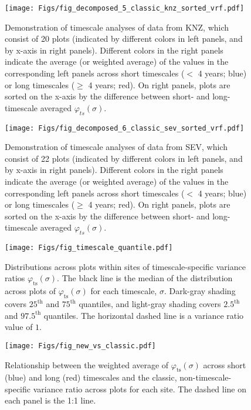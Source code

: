 \documentclass[letterpaper,11pt]{article}
\begin{document}
\begin{figure}
\texttt{[image: Figs/fig\_decomposed\_5\_classic\_knz\_sorted\_vrf.pdf]}
\caption{Demonstration of timescale analyses of data from KNZ, which consist of 20 plots (indicated by different colors in left panels, and by x-axis in right panels). Different colors in the right panels indicate the average (or weighted average) of the values in the corresponding left panels across short timescales ($<$ 4 years; blue) or long timescales ($\geq$ 4 years; red). On right panels, plots are sorted on the x-axis by the difference between short- and long-timescale averaged $\varphi _{ts} (\sigma)$.}
\end{figure}

\begin{figure}
\texttt{[image: Figs/fig\_decomposed\_6\_classic\_sev\_sorted\_vrf.pdf]}
\caption{Demonstration of timescale analyses of data from SEV, which consist of 22 plots (indicated by different colors in left panels, and by x-axis in right panels). Different colors in the right panels indicate the average (or weighted average) of the values in the corresponding left panels across short timescales ($<$ 4 years; blue) or long timescales ($\geq$ 4 years; red). On right panels, plots are sorted on the x-axis by the difference between short- and long-timescale averaged $\varphi _{ts} (\sigma)$.}
\end{figure}

\begin{figure}
\texttt{[image: Figs/fig\_timescale\_quantile.pdf]}
\caption{Distributions across plots within sites of timescale-specific variance ratios
$\varphi_{\text{ts}}(\sigma)$. The black line is the median of the distribution
across plots of $\varphi_{\text{ts}}(\sigma)$ for each timescale, $\sigma$. Dark-gray
shading covers $25^{\text{th}}$ and $75^{\text{th}}$ quantiles, and light-gray 
shading covers $2.5^{\text{th}}$ and $97.5^{\text{th}}$ quantiles. The horizontal 
dashed line is a variance ratio value of $1$.}
\end{figure}

\begin{figure}
\texttt{[image: Figs/fig\_new\_vs\_classic.pdf]}
\caption{Relationship between the weighted average of $\varphi_{\text{ts}}(\sigma)$
across short (blue) and long (red) timescales and the classic, non-timescale-specific
variance ratio across plots for each site. The dashed line on each panel is the 1:1 
line.}
\end{figure}
\end{document}
